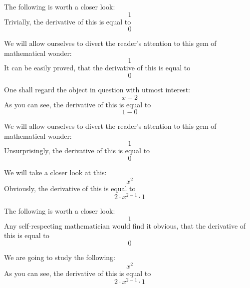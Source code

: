 \documentclass{article}
\begin{document}
The following is worth a closer look:
\begin{equation}
1 
\end{equation}
Trivially, the derivative of this is equal to
\begin{equation}
0 
\end{equation}

We will allow ourselves to divert the reader's attention to this gem of mathematical wonder:
\begin{equation}
1 
\end{equation}
It can be easily proved, that the derivative of this is equal to
\begin{equation}
0 
\end{equation}

One shall regard the object in question with utmost interest:
\begin{equation}
x - 2 
\end{equation}
As you can see, the derivative of this is equal to
\begin{equation}
1 - 0 
\end{equation}

We will allow ourselves to divert the reader's attention to this gem of mathematical wonder:
\begin{equation}
1 
\end{equation}
Unsurprisingly, the derivative of this is equal to
\begin{equation}
0 
\end{equation}

We will take a closer look at this:
\begin{equation}
x ^{2 } 
\end{equation}
Obviously, the derivative of this is equal to
\begin{equation}
2 \cdot x ^{2 - 1 } \cdot 1 
\end{equation}

The following is worth a closer look:
\begin{equation}
1 
\end{equation}
Any self-respecting mathematician would find it obvious, that the derivative of this is equal to
\begin{equation}
0 
\end{equation}

We are going to study the following:
\begin{equation}
x ^{2 } 
\end{equation}
As you can see, the derivative of this is equal to
\begin{equation}
2 \cdot x ^{2 - 1 } \cdot 1 
\end{equation}
\end{document}

